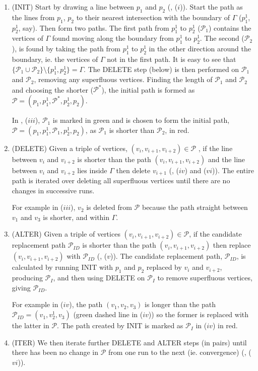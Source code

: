 \begin{enumerate}
\item (INIT) Start by drawing a line between $p_1$ and $p_2$ (, ($i$)). Start the path as the lines from $p_1$, $p_2$ to their nearest intersection with the boundary of $\Gamma$ ($p_1^1$, $p_2^1$, say). Then form two paths. The first path from $p_1^1$ to $p_2^1$ ($\mathcal{P}_1$) contains the vertices of $\Gamma$ found moving along the boundary from $p_1^1$ to $p_2^1$. The second ($\mathcal{P}_2$), is found by taking the path from $p_1^1$ to $p_2^1$ in the other direction around the boundary, ie. the vertices of $\Gamma$ not in the first path. It is easy to see that $\{\mathcal{P}_1 \cup \mathcal{P}_2\} \setminus \{p_1^1, p_2^1\} = \Gamma$. The DELETE step (below) is then performed on $\mathcal{P}_1$ and $\mathcal{P}_2$, removing any superfluous vertices. Finding the length of $\mathcal{P}_1$ and $\mathcal{P}_2$ and choosing the shorter ($\mathcal{P^*}$), the initial path is formed as $\mathcal{P}=(p_1,p_1^1,\mathcal{P}^*,p_2^1,p_2)$. 

In , ($iii$), $\mathcal{P}_1$ is marked in green and is chosen to form the initial path, $\mathcal{P}=(p_1,p_1^1,\mathcal{P}_1,p_2^1,p_2)$, as $\mathcal{P}_1$ is shorter than $\mathcal{P}_2$, in red.

\item (DELETE) Given a triple of vertices, $(v_i, v_{i+1}, v_{i+2}) \in \mathcal{P}$ , if the line between $v_i$ and $v_{i+2}$ is shorter than the path $(v_i, v_{i+1}, v_{i+2})$ and the line between $v_i$ and $v_{i+2}$ lies inside $\Gamma$ then delete $v_{i+1}$ (, ($iv$) and ($vi$)). The entire path is iterated over deleting all superfluous vertices until there are no changes in successive runs. 

For example in  ($iii$), $v_2$ is deleted from $\mathcal{P}$ because the path straight between $v_1$ and $v_3$ is shorter, and within $\Gamma$.

\item (ALTER) Given a triple of vertices $(v_i, v_{i+1}, v_{i+2}) \in \mathcal{P}$, if the candidate replacement path $\mathcal{P}_{ID}$ is shorter than the path $(v_i, v_{i+1}, v_{i+2})$ then replace $(v_i, v_{i+1}, v_{i+2})$ with $\mathcal{P}_{ID}$ (, ($v$)). The candidate replacement path, $\mathcal{P}_{ID}$, is calculated by running INIT with $p_1$ and $p_2$ replaced by $v_i$ and $v_{i+2}$, producing $\mathcal{P}_I$, and then using DELETE on $\mathcal{P}_I$ to remove superfluous vertices, giving $\mathcal{P}_{ID}$.

For example in  ($iv$), the path $(v_1, v_2, v_3)$ is longer than the path $\mathcal{P}_{ID}=(v_1, v^1_2, v_3)$ (green dashed line in ($iv$)) so the former is replaced with the latter in $\mathcal{P}$. The path created by INIT is marked as $\mathcal{P}_{I}$ in  ($iv$) in red.

\item (ITER) We then iterate further DELETE and ALTER steps (in pairs) until there has been no change in $\mathcal{P}$ from one run to the next (ie. convergence) (, ($vi$)).
\end{enumerate}

